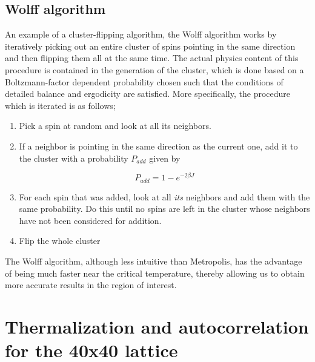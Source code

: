 \documentclass[11pt,a4paper]{article}
\begin{document}
\subsection{Wolff algorithm}
An example of a cluster-flipping algorithm, the Wolff algorithm works by iteratively picking out
 an entire cluster of spins pointing in the same direction and then flipping them all at the same time. The actual physics content
 of this 
 procedure is contained in the generation of the cluster, which is done based on a Boltzmann-factor dependent probability chosen
 such that the
 conditions of detailed balance and ergodicity are satisfied.
 More specifically, the procedure which is iterated is as follows;
 \begin{enumerate}
 \item Pick a spin at random and look at all its neighbors.
 \item If a neighbor is pointing in the same direction as the current one, add it to the cluster with a probability $P_{add}$ given by

\begin{equation}\label{eq:A-ratio}
    P_{add} = 1 - e^{-2\beta J}
\end{equation}
 

 \item For each spin that was added, look at all \textit{its} neighbors and add them with the same probability. Do this until no spins are left
 in the cluster whose neighbors have not been considered for addition.
 \item Flip the whole cluster

 \end{enumerate}

The Wolff algorithm, although less intuitive than Metropolis, has the advantage of being much faster near the critical temperature,
 thereby allowing us to obtain more accurate results in the region of interest.


\pagebreak






\section{Thermalization and autocorrelation for the 40x40 lattice}
\end{document}
